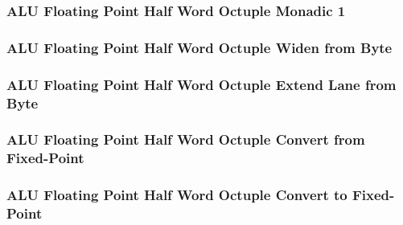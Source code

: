 

\subsubsection[{\small ALU Floating Point Half Word Octuple Monadic 1}]{ALU Floating Point Half Word Octuple Monadic 1} \label{sec:format-ALU-FHOMO1}



\subsubsection[{\small ALU Floating Point Half Word Octuple Widen from Byte}]{ALU Floating Point Half Word Octuple Widen from Byte} \label{sec:format-ALU-FHOWIDENWR}



\subsubsection[{\small ALU Floating Point Half Word Octuple Extend Lane from Byte}]{ALU Floating Point Half Word Octuple Extend Lane from Byte} \label{sec:format-ALU-FHOEXTLWR}



\subsubsection[{\small ALU Floating Point Half Word Octuple Convert from Fixed-Point}]{ALU Floating Point Half Word Octuple Convert from Fixed-Point} \label{sec:format-ALU-FHOFLOAT}



\subsubsection[{\small ALU Floating Point Half Word Octuple Convert to Fixed-Point}]{ALU Floating Point Half Word Octuple Convert to Fixed-Point} \label{sec:format-ALU-FHOFIXED}

